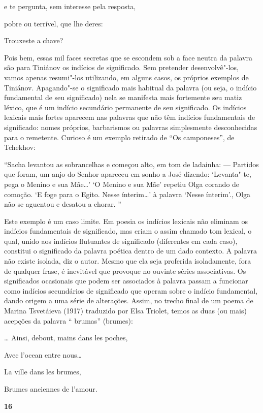 e te pergunta, sem interesse pela resposta,

pobre ou terrível, que lhe deres:

Trouxeste a chave?

Pois bem, essas mil faces secretas que se escondem sob a face neutra da
palavra são para Tiniánov os indícios de significado. Sem pretender
desenvolvê"-los, vamos apenas resumi"-los utilizando, em alguns casos, os
próprios exemplos de Tiniánov. Apagando"-se o significado mais habitual
da palavra (ou seja, o indício fundamental de seu significado) nela se
manifesta mais fortemente seu matiz léxico, que é um indício secundário
permanente de seu significado. Os indícios lexicais mais fortes aparecem
nas palavras que não têm indícios fundamentais de significado: nomes
próprios, barbarismos ou palavras simplesmente desconhecidas para o
remetente. Curioso é um exemplo retirado de ``Os camponeses'', de
Tchekhov:

``Sacha levantou as sobrancelhas e começou alto, em tom de ladainha: ---
Partidos que foram, um anjo do Senhor apareceu em sonho a José dizendo:
`Levanta"-te, pega o Menino e sua Mãe\ldots{}' `O Menino e sua Mãe' repetiu
Olga corando de comoção. `E foge para o Egito. Nesse ínterim\ldots{}' à
palavra `Nesse ínterim'., Olga não se aguentou e desatou a chorar. ''

Este exemplo é um caso limite. Em poesia os indícios lexicais não
eliminam os indícios fundamentais de significado, mas criam o assim
chamado tom lexical, o qual, unido aos indícios flutuantes de
significado (diferentes em cada caso), constitui o significado da
palavra poética dentro de um dado contexto. A palavra não existe
isolada, diz o autor. Mesmo que ela seja proferida isoladamente, fora de
qualquer frase, é inevitável que provoque no ouvinte séries
associativas. Os significados ocasionais que podem ser associados à
palavra passam a funcionar como indícios secundários de significado que
operam sobre o indício fundamental, dando origem a uma série de
alterações. Assim, no trecho final de um poema de Marina Tsvetáieva
(1917) traduzido por Elsa Triolet, temos as duas (ou mais) acepções da
palavra `` brumas'' (brumes):

\ldots{} Ainsi, debout, mains dans les poches,

Avec l'ocean entre nous\ldots{}

La ville dans les brumes,

Brumes anciennes de l'amour.

\textbf{16}

